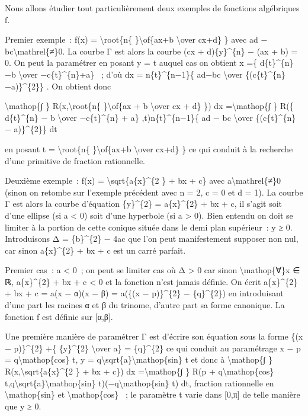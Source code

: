 \documentclass[]{article}
\begin{document}
Nous allons étudier tout particulièrement deux exemples de fonctions
algébriques f.

Premier exemple~: f(x) = \textbackslash{}root\{n\{
\}\textbackslash{}of\{ax+b \textbackslash{}over cx+d\} \} avec ad −
bc\textbackslash{}mathrel\{≠\}0. La courbe Γ est alors la courbe (cx +
d)\{y\}\^{}\{n\} − (ax + b) = 0. On peut la paramétrer en posant y = t
auquel cas on obtient x =\{ d\{t\}\^{}\{n\}−b \textbackslash{}over
−c\{t\}\^{}\{n\}+a\} ~; d'où dx = n\{t\}\^{}\{n−1\}\{ ad−bc
\textbackslash{}over \{(c\{t\}\^{}\{n\}−a)\}\^{}\{2\}\} . On obtient
donc

\textbackslash{}mathop\{∫ \} R(x,\textbackslash{}root\{n\{
\}\textbackslash{}of\{ax + b \textbackslash{}over cx + d\} \}) dx
=\textbackslash{}mathop\{∫ \} R(\{ d\{t\}\^{}\{n\} − b
\textbackslash{}over −c\{t\}\^{}\{n\} + a\} ,t)n\{t\}\^{}\{n−1\}\{ ad −
bc \textbackslash{}over \{(c\{t\}\^{}\{n\} − a)\}\^{}\{2\}\} dt

en posant t = \textbackslash{}root\{n\{ \}\textbackslash{}of\{ax+b
\textbackslash{}over cx+d\} \} ce qui conduit à la recherche d'une
primitive de fraction rationnelle.

Deuxième exemple~: f(x) = \textbackslash{}sqrt\{a\{x\}\^{}\{2 \} + bx +
c\} avec a\textbackslash{}mathrel\{≠\}0 (sinon on retombe sur l'exemple
précédent avec n = 2, c = 0 et d = 1). La courbe Γ est alors la courbe
d'équation \{y\}\^{}\{2\} = a\{x\}\^{}\{2\} + bx + c, il s'agit soit
d'une ellipse (si a \textless{} 0) soit d'une hyperbole (si a
\textgreater{} 0). Bien entendu on doit se limiter à la portion de cette
conique située dans le demi plan supérieur~: y ≥ 0. Introduisons Δ =
\{b\}\^{}\{2\} − 4ac que l'on peut manifestement supposer non nul, car
sinon a\{x\}\^{}\{2\} + bx + c est un carré parfait.

Premier cas~: a \textless{} 0~; on peut se limiter cas où Δ
\textgreater{} 0 car sinon \textbackslash{}mathop\{∀\}x ∈ ℝ,
a\{x\}\^{}\{2\} + bx + c \textless{} 0 et la fonction n'est jamais
définie. On écrit a\{x\}\^{}\{2\} + bx + c = a(x − α)(x − β) = a(\{(x −
p)\}\^{}\{2\} − \{q\}\^{}\{2\}) en introduisant d'une part les racines α
et β du trinome, d'autre part sa forme canonique. La fonction f est
définie sur {[}α,β{]}.

Une première manière de paramétrer Γ est d'écrire son équation sous la
forme \{(x − p)\}\^{}\{2\} +\{ \{y\}\^{}\{2\} \textbackslash{}over
\textbar{}a\textbar{}\} = \{q\}\^{}\{2\} ce qui conduit au paramétrage x
− p = q\textbackslash{}mathop\{cos\} t, y =
q\textbackslash{}sqrt\{\textbar{}a\textbar{}\}\textbackslash{}mathop\{sin\}
t et donc à \textbackslash{}mathop\{∫ \}
R(x,\textbackslash{}sqrt\{a\{x\}\^{}\{2 \} + bx + c\}) dx
=\textbackslash{}mathop\{∫ \} R(p + q\textbackslash{}mathop\{cos\}
t,q\textbackslash{}sqrt\{\textbar{}a\textbar{}\}\textbackslash{}mathop\{sin\}
t)(−q\textbackslash{}mathop\{sin\} t) dt, fraction rationnelle en
\textbackslash{}mathop\{sin\} et \textbackslash{}mathop\{cos\} ~; le
paramètre t varie dans {[}0,π{]} de telle manière que y ≥ 0.
\end{document}
